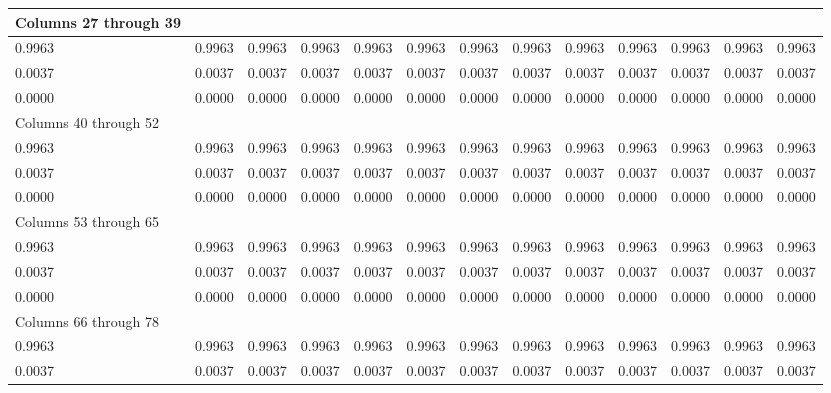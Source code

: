 \begin{table}[!h]
{\begin{tabular}{|l|l|l|l|l|l|l|l|l|l|l|l|l|}
		Columns 27 through 39    &        &        &        &        &        &        &        &        &        &        &        &        \\\hline
		0.9963                   & 0.9963 & 0.9963 & 0.9963 & 0.9963 & 0.9963 & 0.9963 & 0.9963 & 0.9963 & 0.9963 & 0.9963 & 0.9963 & 0.9963 \\\hline
		0.0037                   & 0.0037 & 0.0037 & 0.0037 & 0.0037 & 0.0037 & 0.0037 & 0.0037 & 0.0037 & 0.0037 & 0.0037 & 0.0037 & 0.0037 \\\hline
		0.0000                   & 0.0000 & 0.0000 & 0.0000 & 0.0000 & 0.0000 & 0.0000 & 0.0000 & 0.0000 & 0.0000 & 0.0000 & 0.0000 & 0.0000 \\\hline
		Columns 40 through 52    &        &        &        &        &        &        &        &        &        &        &        &        \\\hline
		0.9963                   & 0.9963 & 0.9963 & 0.9963 & 0.9963 & 0.9963 & 0.9963 & 0.9963 & 0.9963 & 0.9963 & 0.9963 & 0.9963 & 0.9963 \\\hline
		0.0037                   & 0.0037 & 0.0037 & 0.0037 & 0.0037 & 0.0037 & 0.0037 & 0.0037 & 0.0037 & 0.0037 & 0.0037 & 0.0037 & 0.0037 \\\hline
		0.0000                   & 0.0000 & 0.0000 & 0.0000 & 0.0000 & 0.0000 & 0.0000 & 0.0000 & 0.0000 & 0.0000 & 0.0000 & 0.0000 & 0.0000 \\\hline
		Columns 53 through 65    &        &        &        &        &        &        &        &        &        &        &        &        \\\hline
		0.9963                   & 0.9963 & 0.9963 & 0.9963 & 0.9963 & 0.9963 & 0.9963 & 0.9963 & 0.9963 & 0.9963 & 0.9963 & 0.9963 & 0.9963 \\\hline
		0.0037                   & 0.0037 & 0.0037 & 0.0037 & 0.0037 & 0.0037 & 0.0037 & 0.0037 & 0.0037 & 0.0037 & 0.0037 & 0.0037 & 0.0037 \\\hline
		0.0000                   & 0.0000 & 0.0000 & 0.0000 & 0.0000 & 0.0000 & 0.0000 & 0.0000 & 0.0000 & 0.0000 & 0.0000 & 0.0000 & 0.0000 \\\hline
		Columns 66 through 78    &        &        &        &        &        &        &        &        &        &        &        &        \\\hline
		0.9963                   & 0.9963 & 0.9963 & 0.9963 & 0.9963 & 0.9963 & 0.9963 & 0.9963 & 0.9963 & 0.9963 & 0.9963 & 0.9963 & 0.9963 \\\hline
		0.0037                   & 0.0037 & 0.0037 & 0.0037 & 0.0037 & 0.0037 & 0.0037 & 0.0037 & 0.0037 & 0.0037 & 0.0037 & 0.0037 & 0.0037 \\\hline

\end{tabular}}
\end{table}
